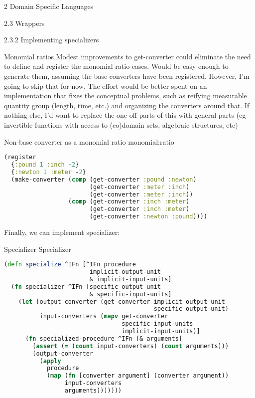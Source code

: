 \documentclass[12pt]{PalisadesLakesBook}
\begin{document}
\begin{plSection}{}
\begin{plSection}{2 Domain Specific Languages}
\begin{plSection}{2.3 Wrappers}
\begin{plSection}{2.3.2 Implementing specializers}
\begin{plSection}{Monomial ratios}
Modest improvements to {\clojureFont get-converter}
 could eliminate the need
to define and register the monomial ratio cases.
Would be easy enough to generate them, assuming the base
converters have been registered. 
However, I'm going to skip that for now.
The effort would be better spent on an implementation
that fixes the conceptual problems, such as reifying
measurable quantity group (length, time, etc.)
and organizing the converters around that.
If nothing else, I'd want to replace the one-off parts
of this with general parts (eg invertible functions
with access to (co)domain sets, algebraic structures, etc)

\begin{plListing}
{Non-base converter as a monomial ratio}
{monomial:ratio}
\begin{lstlisting}[language=clojure]
(register 
  {:pound 1 :inch -2}
  {:newton 1 :meter -2}
  (make-converter (comp (get-converter :pound :newton)
                        (get-converter :meter :inch)
                        (get-converter :meter :inch))
                  (comp (get-converter :inch :meter) 
                        (get-converter :inch :meter) 
                        (get-converter :newton :pound))))
\end{lstlisting}
\end{plListing}
\end{plSection}%

Finally, we can implement {\clojureFont specializer}:

\begin{plListing}
{Specializer}
{Specializer}
\begin{lstlisting}[language=clojure]
(defn specialize ^IFn [^IFn procedure
                        implicit-output-unit
                        & implicit-input-units]
  (fn specializer ^IFn [specific-output-unit
                        & specific-input-units]
    (let [output-converter (get-converter implicit-output-unit
                                          specific-output-unit)
          input-converters (mapv get-converter 
                                 specific-input-units
                                 implicit-input-units)]
      (fn specialized-procedure ^IFn [& arguments]
        (assert (= (count input-converters) (count arguments)))
        (output-converter
          (apply 
            procedure
            (map (fn [converter argument] (converter argument))
                 input-converters
                 arguments)))))))
\end{lstlisting}
\end{plListing}


\end{plSection}
\end{plSection}
\end{plSection}
\end{plSection}
\end{document}
